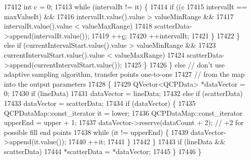 \begin{DoxyCode}
17412         \textcolor{keywordtype}{int} c = 0;
17413         \textcolor{keywordflow}{while} (intervalIt != it) \{
17414           \textcolor{keywordflow}{if} ((c %
17415                intervalIt == maxValueIt) &&
17416               intervalIt.value().value > valueMinRange &&
17417               intervalIt.value().value < valueMaxRange)
17418             scatterData->append(intervalIt.value());
17419           ++\hyperlink{_comparision_pictures_2_createtest_image_8m_ae0323a9039add2978bf5b49550572c7c}{c};
17420           ++intervalIt;
17421         \}
17422       \} \textcolor{keywordflow}{else} \textcolor{keywordflow}{if} (currentIntervalStart.value().value > valueMinRange &&
17423                  currentIntervalStart.value().value < valueMaxRange)
17424         scatterData->append(currentIntervalStart.value());
17425     \}
17426   \} \textcolor{keywordflow}{else} \textcolor{comment}{// don't use adaptive sampling algorithm, transfer points one-to-one}
17427          \textcolor{comment}{// from the map into the output parameters}
17428   \{
17429     QVector<QCPData> *dataVector = 0;
17430     \textcolor{keywordflow}{if} (lineData)
17431       dataVector = lineData;
17432     \textcolor{keywordflow}{else} \textcolor{keywordflow}{if} (scatterData)
17433       dataVector = scatterData;
17434     \textcolor{keywordflow}{if} (dataVector) \{
17435       QCPDataMap::const\_iterator it = lower;
17436       QCPDataMap::const\_iterator upperEnd = upper + 1;
17437       dataVector->reserve(dataCount + 2); \textcolor{comment}{// +2 for possible fill end points}
17438       \textcolor{keywordflow}{while} (it != upperEnd) \{
17439         dataVector->append(it.value());
17440         ++it;
17441       \}
17442     \}
17443     \textcolor{keywordflow}{if} (lineData && scatterData)
17444       *scatterData = *dataVector;
17445   \}
17446 \}
\end{DoxyCode}


